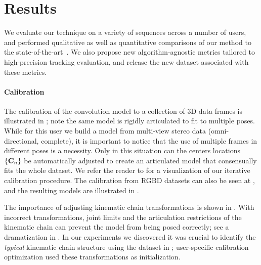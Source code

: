 \section{Results}
\label{sec:results}
We evaluate our technique on a variety of sequences across a number of users, 
and performed qualitative as well as quantitative  
comparisons of our method to the state-of-the-art~\cite{qian2014realtime,sridhar2015fast,tagliasacchi2015robust,sharp2015accurate,taylor2016concerto}. We also propose new algorithm-agnostic metrics tailored to high-precision tracking evaluation, and release the new \handy{} dataset associated with these metrics.

\paragraph{Calibration}
The calibration of the convolution model to a collection of 3D data frames is illustrated in ; note the same model is rigidly articulated to fit to multiple poses. While for this user we build a model from multi-view stereo data (omni-directional, complete), it is important to notice that the use of multiple frames in different poses is a necessity. Only in this situation can the centers locations ${\{\mathbf{C}_n\}}$ be automatically adjusted to create an articulated model that consensually fits the whole dataset. We refer the reader to  for a visualization of our iterative calibration procedure. The calibration from RGBD datasets can also be seen at , and the resulting models are illustrated in . 

The importance of adjusting kinematic chain transformations is  shown in . With incorrect  transformations, joint limits and the articulation restrictions of the kinematic chain can prevent the model from being posed correctly; see a dramatization in . In our experiments we discovered it was crucial to identify the \emph{typical} kinematic chain structure using the dataset in ; user-specific calibration optimization used these transformations as initialization.

